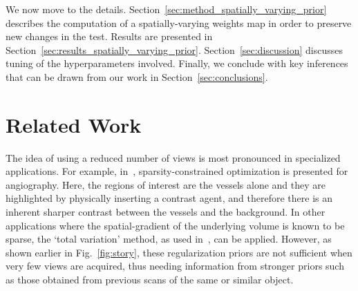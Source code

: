 \documentclass[journal]{IEEEtran}
\begin{document}
We now move to the
details. Section~\ref{sec:method_spatially_varying_prior} describes
the computation of a spatially-varying weights map in order to preserve
new changes in the test.  Results are presented in
Section~\ref{sec:results_spatially_varying_prior}. Section~\ref{sec:discussion}
discusses tuning of the hyperparameters involved. %
 Finally, we conclude with key inferences that can be
 drawn from our work in Section~\ref{sec:conclusions}.
 

 \section{Related Work}
 \label{sec:related}
 The idea of using a reduced number of views is most pronounced in
 specialized applications. For example, in~\cite{Essam2015},
 sparsity-constrained optimization is presented for angiography. Here,
 the regions of interest are the vessels alone and they are
 highlighted by physically inserting a contrast agent, and therefore
 there is an inherent sharper contrast between the vessels and the
 background.  In other applications where the spatial-gradient of the
 underlying volume is known to be sparse, the `total variation'
 method, as used in~\cite{Li2015,Polak2017}, can be applied.  However,
 as shown earlier in Fig.~\ref{fig:story}, these regularization priors
 are not sufficient when very few views are acquired, thus needing
 information from stronger priors such as those obtained from previous
 scans of the same or similar object.

\end{document}
